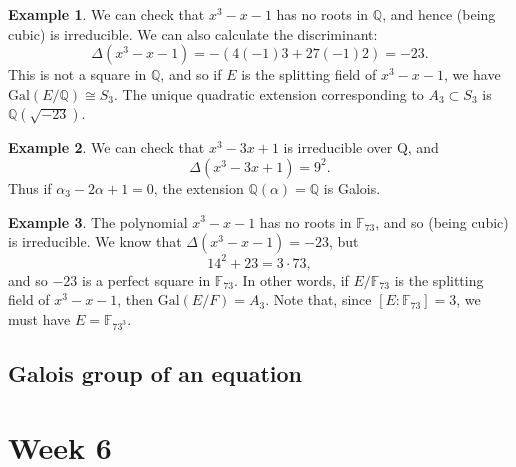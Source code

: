 \documentclass[12pt]{report}
\newtheorem{thm}{Theorem}[section]
\theoremstyle{definition}
\newtheorem{example}[thm]{Example}
\def\ZZ{\mathbb{Z}}
\def\QQ{\mathbb{Q}}
\def\FF{\mathbb{F}}
\def\aa{\alpha}
\def\Gal{\text{Gal}}
\begin{document}
\begin{example}
    We can check that $x^3 - x - 1$ has no roots in $\QQ$, and hence (being cubic) is irreducible. We can also calculate the discriminant:
    $$\Delta(x^3 - x - 1) = -(4(-1)3 + 27(-1)2) = -23.$$
    This is not a square in $\QQ$, and so if $E$ is the splitting field of $x^3 - x - 1$, we have $\Gal(E/\QQ) \cong S_3$. The unique quadratic extension corresponding to $A_3 \subset S_3$ is $\QQ(\sqrt{-23})$.
\end{example}

\begin{example}
    We can check that $x^3 - 3x + 1$ is irreducible over Q, and
    $$\Delta(x^3 - 3x + 1) = 9^2.$$
    Thus if $\aa_3 - 2\aa + 1 = 0$, the extension $\QQ(\aa)=\QQ$ is Galois.
\end{example}

\begin{example}
    The polynomial $x^3 -x-1$ has no roots in $\FF_{73}$, and so (being cubic) is irreducible. We know that $\Delta(x^3 - x - 1) = -23$, but
    $$14^2 + 23 = 3 \cdot 73,$$ and so $-23$ is a perfect square in $\FF_{73}$. In other words, if $E/\FF_{73}$ is the splitting field of $x^3 - x - 1$, then $\Gal(E/F) = A_3$. Note that, since $[E : \FF_{73}] = 3$, we must have $E = \FF_{73^3}$.
\end{example}

\section{Galois group of an equation}

\chapter*{Week 6}
\setcounter{chapter}{6}


\end{document}
